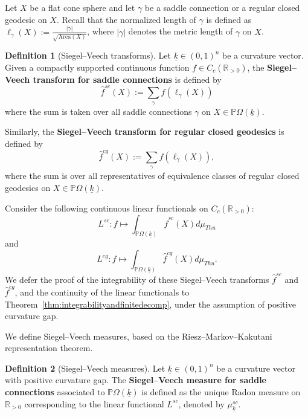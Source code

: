 \documentclass{compositio}
\numberwithin{equation}{section}
\numberwithin{figure}{section}
\theoremstyle{definition}
\newtheorem{definition}{Definition}[section]
\theoremstyle{plain}
\begin{document}
{Let $X$ be a flat cone sphere and let $\gamma$ be a saddle connection or a regular closed geodesic on $X$. Recall that the normalized length of $\gamma$ is defined as $\ell_{\gamma}(X):=\frac{|\gamma|}{\sqrt{\mathrm{Area}(X)}}$, where $|\gamma|$ denotes the metric length of $\gamma$ on $X$.

\begin{definition}[Siegel--Veech transforms]
Let $\underline{k}\in(0,1)^n$ be a curvature vector. Given a compactly supported continuous function $f \in C_c(\mathbb{R}_{>0})$, the \textbf{Siegel--Veech transform for saddle connections} is defined by
\begin{equation}\label{equ:scsvt}
    \hat{f}^{sc}(X) := \sum_{\gamma} f(\ell_{\gamma}(X))
\end{equation}
where the sum is taken over all saddle connections $\gamma$ on $X \in \mathbb{P}\Omega(\underline{k})$.

Similarly, the \textbf{Siegel--Veech transform for regular closed geodesics} is defined by
\begin{equation}\label{equ:cgsvt}
    \hat{f}^{cg}(X) := \sum_{\gamma} f(\ell_{\gamma}(X)),
\end{equation}
where the sum is over all representatives of equivalence classes of regular closed geodesics on $X \in \mathbb{P}\Omega(\underline{k})$.
\end{definition}

Consider the following continuous linear functionals on $C_c(\mathbb{R}_{>0})$:
\begin{equation}\label{equ:lfsc}
    L^{sc}: f \mapsto \int_{\mathbb{P}\Omega(\underline k)}\hat{f}^{sc}(X)d\mu_{Thu}
\end{equation}
and 
\begin{equation}\label{equ:lfcg}
    L^{cg}: f \mapsto \int_{\mathbb{P}\Omega(\underline k)}\hat{f}^{cg}(X)d\mu_{Thu}.
\end{equation}
We defer the proof of the integrability of these Siegel--Veech transforms $\hat{f}^{sc}$ and $\hat{f}^{cg}$, and the continuity of the linear functionals to Theorem~\ref{thm:integrabilityandfinitedecomp}, under the assumption of positive curvature gap.

We define Siegel--Veech measures, based on the Riesz–Markov–Kakutani representation theorem.

\begin{definition}[Siegel--Veech measures]\label{def:svmeasures}
    Let $\underline{k}\in (0,1)^n$ be a curvature vector with positive curvature gap. The \textbf{Siegel--Veech measure for saddle connections} associated to $\mathbb{P}\Omega(\underline k)$ is defined as the unique Radon measure on $\mathbb{R}_{>0}$ corresponding to the linear functional $L^{sc}$, denoted by $\mu^{sc}_{\underline{k}}$.
    

\end{definition}}
\end{document}
